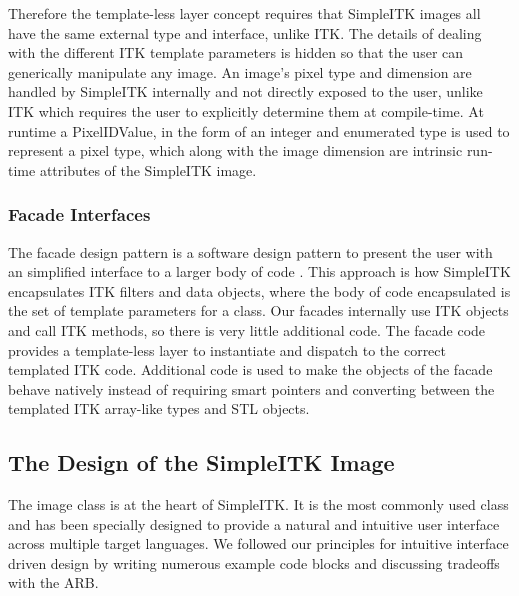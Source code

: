 \documentclass{frontiersMED} %
\begin{document}
Therefore the template-less layer concept requires that SimpleITK
images all have the same external type and interface, unlike ITK. The
details of dealing with the different ITK template parameters is
hidden so that the user can generically manipulate any image. An
image’s pixel type and dimension are handled by SimpleITK internally
and not directly exposed to the user, unlike ITK which requires the
user to explicitly determine them at compile-time. At runtime a
PixelIDValue, in the form of an integer and enumerated type is used to
represent a pixel type, which along with the image dimension are
intrinsic run-time attributes of the SimpleITK image.

\subsubsection{Facade Interfaces}
The facade design pattern is a software design pattern to present the
user with an simplified interface to a larger body of code
\cite{Gamma1995}. This approach is how SimpleITK encapsulates ITK filters
and data objects, where  the body of code encapsulated is the set of
template parameters for a class. Our facades internally use ITK
objects and call ITK methods, so there is very little additional
code. The facade code provides a template-less layer to instantiate
and dispatch to the correct templated ITK code. Additional code is
used to make the objects of the facade behave natively instead of
requiring smart pointers and converting between the templated ITK
array-like types and STL objects.

\subsection{The Design of the SimpleITK Image}
The image class is at the heart of SimpleITK. It is the most commonly
used class and has been specially designed to provide a natural and
intuitive user interface across multiple target languages. We followed
our principles for intuitive interface driven design by writing
numerous example code blocks and discussing tradeoffs with the ARB.
\end{document}
